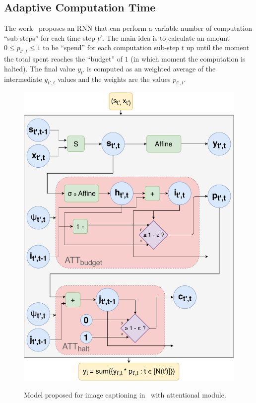\documentclass[11pt]{article}
\begin{document}
\subsection{Adaptive Computation Time}
The work~\cite{ref:act} proposes an RNN that can perform a variable number of computation ``sub-steps'' for each time step $t'$.
The main idea is to calculate an amount $0 \le p_{t',t} \le 1$ to be ``spend'' for each computation sub-step $t$ up until the
moment the total spent reaches the ``budget'' of $1$ (in which moment the computation is halted).
The final value $y_{t'}$ is computed as an weighted average of the intermediate $y_{t',t}$ values and the weights are the values
$p_{t',t}$.

\begin{figure}[H]
    \centering
    \includegraphics[width=0.65\linewidth]{./img/act.pdf}
    \label{fig:act}
    \caption{Model proposed for image captioning in~\cite{ref:act} with attentional module.}
\end{figure}
\end{document}
